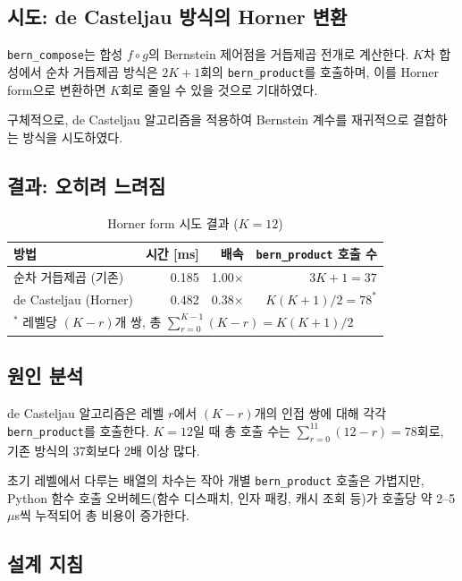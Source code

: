 \documentclass[11pt]{article}
\begin{document}
\subsection{시도: de Casteljau 방식의 Horner 변환}

\texttt{bern\_compose}는 합성 $f \circ g$의 Bernstein 제어점을
거듭제곱 전개로 계산한다.
$K$차 합성에서 순차 거듭제곱 방식은 $2K+1$회의
\texttt{bern\_product}를 호출하며,
이를 Horner form으로 변환하면 $K$회로 줄일 수 있을 것으로 기대하였다.

구체적으로, de Casteljau 알고리즘을 적용하여
Bernstein 계수를 재귀적으로 결합하는 방식을 시도하였다.

\subsection{결과: 오히려 느려짐}

\begin{table}[h]
\centering
\caption{Horner form 시도 결과 ($K = 12$)}
\label{tab:horner}
\begin{tabular}{lrrr}
\toprule
방법 & 시간 [ms] & 배속 & \texttt{bern\_product} 호출 수 \\
\midrule
순차 거듭제곱 (기존) & 0.185 & 1.00$\times$ & $3K+1 = 37$ \\
de Casteljau (Horner) & 0.482 & 0.38$\times$ & $K(K+1)/2 = 78^*$ \\
\bottomrule
\multicolumn{4}{l}{\footnotesize $^*$ 레벨당 $(K-r)$개 쌍, 총 $\sum_{r=0}^{K-1}(K-r) = K(K+1)/2$} \\
\end{tabular}
\end{table}

\subsection{원인 분석}

de Casteljau 알고리즘은 레벨 $r$에서 $(K-r)$개의 인접 쌍에 대해
각각 \texttt{bern\_product}를 호출한다.
$K=12$일 때 총 호출 수는
$\sum_{r=0}^{11}(12-r) = 78$회로,
기존 방식의 37회보다 2배 이상 많다.

초기 레벨에서 다루는 배열의 차수는 작아
개별 \texttt{bern\_product} 호출은 가볍지만,
Python 함수 호출 오버헤드(함수 디스패치, 인자 패킹, 캐시 조회 등)가
호출당 약 2--5\,$\mu$s씩 누적되어 총 비용이 증가한다.

\subsection{설계 지침}
\end{document}
